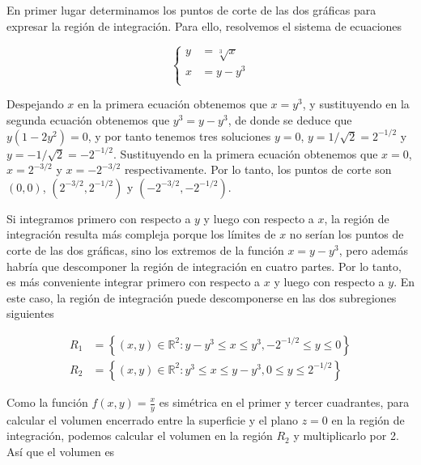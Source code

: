 \documentclass[
  spanish,
  a4paper,
]{scrreport}
\theoremstyle{definition}
\theoremstyle{remark}
\begin{document}
\begin{tcolorbox}[enhanced jigsaw, arc=.35mm, bottomrule=.15mm, bottomtitle=1mm, breakable, colback=white, colbacktitle=quarto-callout-tip-color!10!white, colframe=quarto-callout-tip-color-frame, coltitle=black, left=2mm, leftrule=.75mm, opacityback=0, opacitybacktitle=0.6, rightrule=.15mm, title=\textcolor{quarto-callout-tip-color}{\faLightbulb}\hspace{0.5em}{Solución}, titlerule=0mm, toprule=.15mm, toptitle=1mm]

En primer lugar determinamos los puntos de corte de las dos gráficas
para expresar la región de integración. Para ello, resolvemos el sistema
de ecuaciones

\[
\begin{cases}
y &= \sqrt[3]{x}\\
x &= y-y^3 \\
\end{cases}
\]

Despejando \(x\) en la primera ecuación obtenemos que \(x=y^3\), y
sustituyendo en la segunda ecuación obtenemos que \(y^3 = y-y^3\), de
donde se deduce que \(y(1-2y^2)=0\), y por tanto tenemos tres soluciones
\(y=0\), \(y=1/\sqrt{2}=2^{-1/2}\) y \(y=-1/\sqrt{2}=-2^{-1/2}\).
Sustituyendo en la primera ecuación obtenemos que \(x=0\),
\(x=2^{-3/2}\) y \(x=-2^{-3/2}\) respectivamente. Por lo tanto, los
puntos de corte son \((0,0)\), \((2^{-3/2}, 2^{-1/2})\) y
\((-2^{-3/2}, -2^{-1/2})\).

Si integramos primero con respecto a \(y\) y luego con respecto a \(x\),
la región de integración resulta más compleja porque los límites de
\(x\) no serían los puntos de corte de las dos gráficas, sino los
extremos de la función \(x=y-y^3\), pero además habría que descomponer
la región de integración en cuatro partes. Por lo tanto, es más
conveniente integrar primero con respecto a \(x\) y luego con respecto a
\(y\). En este caso, la región de integración puede descomponerse en las
dos subregiones siguientes

\begin{align*}
R_1 &= \left\{ (x,y) \in \mathbb{R}^2:  y-y^3 \leq x \leq y^3, -2^{-1/2} \leq y \leq 0 \right\} \\
R_2 &= \left\{ (x,y) \in \mathbb{R}^2:  y^3 \leq x \leq y-y^3, 0 \leq y \leq 2^{-1/2} \right\}
\end{align*}

Como la función \(f(x,y)=\frac{x}{y}\) es simétrica en el primer y
tercer cuadrantes, para calcular el volumen encerrado entre la
superficie y el plano \(z=0\) en la región de integración, podemos
calcular el volumen en la región \(R_2\) y multiplicarlo por 2. Así que
el volumen es


\end{tcolorbox}
\end{document}

